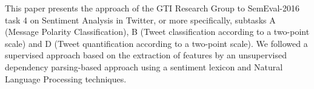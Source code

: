 This paper presents the approach of the GTI Research Group to SemEval-2016 task 4 on Sentiment Analysis in Twitter, or more specifically, subtasks A (Message Polarity Classification), B (Tweet classification according to a two-point scale) and D (Tweet quantification according to a two-point scale). We followed a supervised approach based on the extraction of features by an unsupervised dependency parsing-based approach using a sentiment lexicon and Natural Language Processing techniques.
